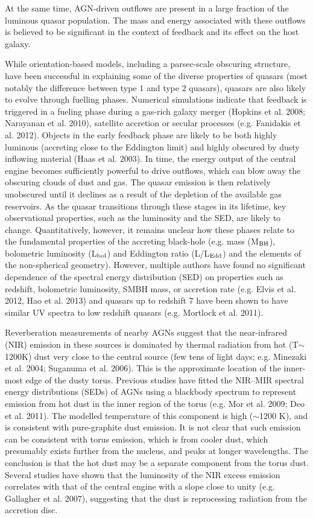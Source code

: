 At the same time, AGN-driven outflows are present in a large fraction of the luminous quasar population. 
The mass and energy associated with these outflows is believed to be significant in the context of feedback and its effect on the host galaxy. 

While orientation-based models, including a parsec-scale obscuring structure, have been successful in explaining some of the diverse properties of quasars (most notably the difference between type 1 and type 2 quasars), quasars are also likely to evolve through fuelling phases. 
Numerical simulations indicate that feedback is triggered in a fueling phase during a gas-rich galaxy merger (Hopkins et al. 2008; Narayanan et al. 2010), satellite accretion or secular processes (e.g. Fanidakis et al. 2012). 
Objects in the early feedback phase are likely to be both highly luminous (accreting close to the Eddington limit) and highly obscured by dusty inflowing material (Haas et al. 2003). 
In time, the energy output of the  central engine becomes sufficiently powerful to drive outflows, which can blow away the obscuring clouds of dust and gas. 
The quasar emission is then relatively unobscured until it declines as a result of the depletion of the available gas reservoirs. 
As the quasar transitions through these stages in its lifetime, key observational properties, such as the luminosity and the SED, are likely to change. 
Quantitatively, however, it remains unclear how these phases relate to the fundamental properties of the accreting black-hole (e.g.  mass (M$_{\rm{BH}}$), bolometric luminosity (L$_{\rm{bol}}$) and Eddington ratio (L/L$_{\rm{Edd}}$) and the elements of the non-spherical geometry). 
However, multiple authors have found no significant dependence of the spectral energy distribution (SED) on properties such as redshift, bolometric luminosity, SMBH mass, or accretion rate (e.g. Elvis et al. 2012, Hao et al. 2013) and quasars up to redshift 7 have been shown to have similar UV spectra to low redshift quasars (e.g. Mortlock et al. 2011). 

Reverberation measurements of nearby AGNs suggest that the near-infrared (NIR) emission in these sources is dominated by thermal radiation from hot (T$\sim$1200K) dust very close to the central source (few tens of light days; e.g. Minezaki et al. 2004; Suganuma et al. 2006). 
This is the approximate location of the inner-most edge of the dusty torus. 
Previous studies have fitted the NIR–MIR spectral energy distributions (SEDs) of AGNs using a blackbody spectrum to represent emission from hot dust in the inner region of the torus (e.g. Mor et al. 2009; Deo et al. 2011). 
The modelled temperature of this component is high ($\sim$1200 K), and is consistent with pure-graphite dust emission.  
It is not clear that such emission can be consistent with torus emission, which is from cooler dust, which presumably exists further from the nucleus, and peaks at longer wavelengths.  
The conclusion is that the hot dust may be a separate component from the torus dust. 
Several studies have shown that the luminosity of the NIR excess emission correlates with that of the central engine with a slope close to unity (e.g. Gallagher et al. 2007), suggesting that the dust is reprocessing radiation from the accretion disc. 

